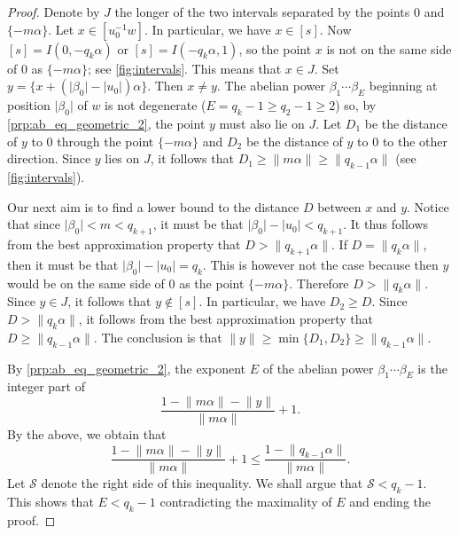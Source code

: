 \documentclass[a4paper,fleqn]{article}
\providecommand{\abs}[1]{\lvert#1\rvert}
\providecommand{\norm}[1]{\lVert#1\rVert}
\begin{document}
\begin{proof}
    Denote by $J$ the longer of the two intervals separated by the points $0$ and $\{-m\alpha\}$. Let
    $x \in [u_0^{-1} w]$. In particular, we have $x \in [s]$. Now $[s] = I(0, -q_k\alpha)$ or $[s] = I(-q_k\alpha, 1)$,
    so the point $x$ is not on the same side of $0$ as $\{-m\alpha\}$; see \autoref{fig:intervals}. This means that
    $x \in J$. Set $y = \{x + (\abs{\beta_0} - \abs{u_0})\alpha\}$. Then $x \neq y$. The abelian power
    $\beta_1 \cdots \beta_E$ beginning at position $\abs{\beta_0}$ of $w$ is not degenerate
    ($E = q_k - 1 \geq q_2 - 1 \geq 2$) so, by \autoref{prp:ab_eq_geometric_2}, the point $y$ must also lie on $J$. Let
    $D_1$ be the distance of $y$ to $0$ through the point $\{-m\alpha\}$ and $D_2$ be the distance of $y$ to $0$ to the
    other direction. Since $y$ lies on $J$, it follows that $D_1 \geq \norm{m\alpha} \geq \norm{q_{k-1}\alpha}$ (see
    \autoref{fig:intervals}).
    
    Our next aim is to find a lower bound to the distance $D$ between $x$ and $y$. Notice that since
    $\abs{\beta_0} < m < q_{k+1}$, it must be that $\abs{\beta_0} - \abs{u_0} < q_{k+1}$. It thus follows from the best
    approximation property that $D > \norm{q_{k+1}\alpha}$. If $D = \norm{q_k\alpha}$, then it must be that
    $\abs{\beta_0} - \abs{u_0} = q_k$. This is however not the case because then $y$ would be on the same side of
    $0$ as the point $\{-m\alpha\}$. Therefore $D > \norm{q_k\alpha}$. Since $y \in J$, it follows that $y \notin [s]$.
    In particular, we have $D_2 \geq D$. Since $D > \norm{q_k\alpha}$, it follows from the best approximation
    property that $D \geq \norm{q_{k-1}\alpha}$. The conclusion is that
    $\norm{y} \geq \min\{D_1, D_2\} \geq \norm{q_{k-1}\alpha}$.

    By \autoref{prp:ab_eq_geometric_2}, the exponent $E$ of the abelian power $\beta_1 \cdots \beta_E$ is the integer
    part of
    \begin{equation*}
      \frac{1 - \norm{m\alpha} - \norm{y}}{\norm{m\alpha}} + 1.
    \end{equation*}
    By the above, we obtain that
    \begin{equation*}
      \frac{1 - \norm{m\alpha} - \norm{y}}{\norm{m\alpha}} + 1 \leq \frac{1 - \norm{q_{k-1}\alpha}}{\norm{m\alpha}}.
    \end{equation*}
    Let $\mathcal{S}$ denote the right side of this inequality. We shall argue that $\mathcal{S} < q_k - 1$. This shows
    that $E < q_k - 1$ contradicting the maximality of $E$ and ending the proof.


\end{proof}
\end{document}
